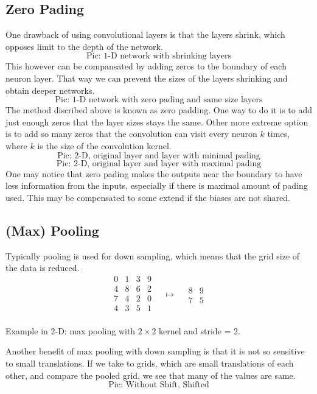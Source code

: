 \documentclass[]{article}
\begin{document}
\subsection{Zero Pading}
One drawback of using convolutional layers is that the layers shrink, which
opposes limit to the depth of the network.
\[
\text{Pic: 1-D network with shrinking layers}
\]
This however can be compansated by
adding zeros to the boundary of each neuron layer. That way we can prevent the
sizes of the layers shrinking and obtain deeper networks.
\[
\text{Pic: 1-D network with zero pading and same size layers}
\]
The method discribed above is known as zero padding. One way to do it is to add
just enough zeros that the layer sizes stays the same. Other more extreme option
is to add so many zeros that the convolution can visit every neuron $k$ times,
where $k$ is the size of the convolution kernel.
\[
\text{Pic: 2-D, original layer and layer with minimal pading}
\]
\[
\text{Pic: 2-D, original layer and layer with maximal pading}
\]
One may notice that zero pading makes the outputs near the boundary to have less
information from the inputs, especially if there is maximal amount of pading
used. This may be compensated to some extend if the biases are not shared.
\subsection{(Max) Pooling}
Typically pooling is used for down sampling, which means that the grid size of
the data is reduced.
\[
\begin{array}{c|c|c|c}
  0 & 1 & 3 & 9\\
  \hline
  4 & 8 & 6 & 2\\
  \hline
  7 & 4 & 2 & 0\\
  \hline
  4 & 3 & 5 & 1\\
 \end{array}
 \quad \mapsto \quad
 \begin{array}{c|c}
   8 & 9\\
   \hline
   7 & 5
  \end{array}
 \]
\begin{center}Example in 2-D: max pooling with $2\times2$ kernel and stride = 2.\end{center}
Another benefit of max pooling with down sampling is that it is not so sensitive
to small translations. If we take to grids, which are small translations of each
other, and compare the pooled grid, we see that many of the values are same.
\[
\text{Pic: Without Shift, Shifted}
\]
\end{document}
